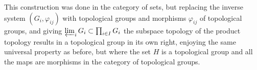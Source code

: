 \documentclass[12pt]{article}
\theoremstyle{plain}
\theoremstyle{definition}
\begin{document}
This construction was done in the category of sets, but replacing the inverse system $(G_i, \varphi_{ij})$ with topological groups and morphisms $\varphi_{ij}$ of topological groups, and giving $\varprojlim_i G_i \subset \prod_{i \in I} G_i$ the subspace topology of the product topology results in a topological group in its own right, enjoying the same universal property as before, but where the set $H$ is a topological group and all the maps are morphisms in the category of topological groups.














%








\newpage


{}
\end{document}
